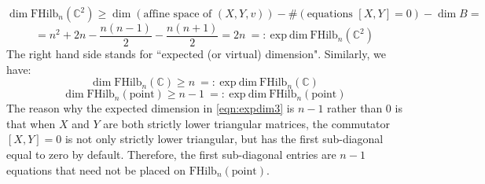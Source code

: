 \documentclass[12pt]{amsart}
\numberwithin{equation}{section}
\theoremstyle{definition}
\theoremstyle{remark}
\newcommand{\CC}{\mathbb{C}}
\renewcommand{\1}{\mathbf{1}}
\newcommand{\FH}{\mathrm{FHilb}}
\newcommand{\point}{\mathrm{point}}
\newcommand{\expdim}{\mathrm{exp \ dim \ }}
\begin{document}
$$
\dim \FH_n(\CC^2) \geq \dim \left(\text{affine space of }(X,Y,v)\right) - \#\left(\text{equations }[X,Y]=0\right) - \dim B = 
$$
\begin{equation}
\label{eqn:expdim1}
= n^2+2n - \frac {n(n-1)}2 - \frac {n(n+1)}2 = 2n \ =: \ \expdim \FH_n(\CC^2)
\end{equation}
The right hand side stands for ``expected (or virtual) dimension". Similarly, we have:
\begin{equation}
\label{eqn:expdim2}
\dim \FH_n(\CC) \geq n \ =: \ \expdim \FH_n(\CC)
\end{equation}
\begin{equation}
\label{eqn:expdim3}
\dim \FH_n(\point) \geq n-1 \ =: \ \expdim \FH_n(\point)
\end{equation}
The reason why the expected dimension in \eqref{eqn:expdim3} is $n-1$ rather than 0 is that when $X$ and $Y$ are both strictly lower triangular matrices, the commutator $[X,Y]=0$ is not only strictly lower triangular, but has the first sub-diagonal equal to zero by default. Therefore, the first sub-diagonal entries are $n-1$ equations that need not be placed on $\FH_n(\point)$. 
\end{document}
